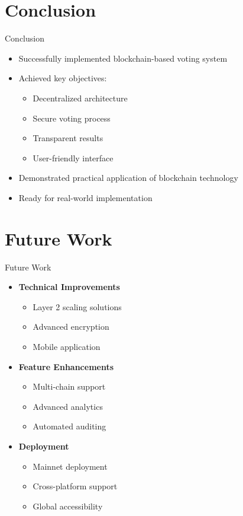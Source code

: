 \documentclass{beamer}
\begin{document}
\section{Conclusion}
\begin{frame}{Conclusion}
  \begin{itemize}
    \item Successfully implemented blockchain-based voting system
    \item Achieved key objectives:
      \begin{itemize}
        \item Decentralized architecture
        \item Secure voting process
        \item Transparent results
        \item User-friendly interface
      \end{itemize}
    \item Demonstrated practical application of blockchain technology
    \item Ready for real-world implementation
  \end{itemize}
\end{frame}

\section{Future Work}
\begin{frame}{Future Work}
  \begin{itemize}
    \item \textbf{Technical Improvements}
      \begin{itemize}
        \item Layer 2 scaling solutions
        \item Advanced encryption
        \item Mobile application
      \end{itemize}
    \item \textbf{Feature Enhancements}
      \begin{itemize}
        \item Multi-chain support
        \item Advanced analytics
        \item Automated auditing
      \end{itemize}
    \item \textbf{Deployment}
      \begin{itemize}
        \item Mainnet deployment
        \item Cross-platform support
        \item Global accessibility
      \end{itemize}
  \end{itemize}
\end{frame}
\end{document}
